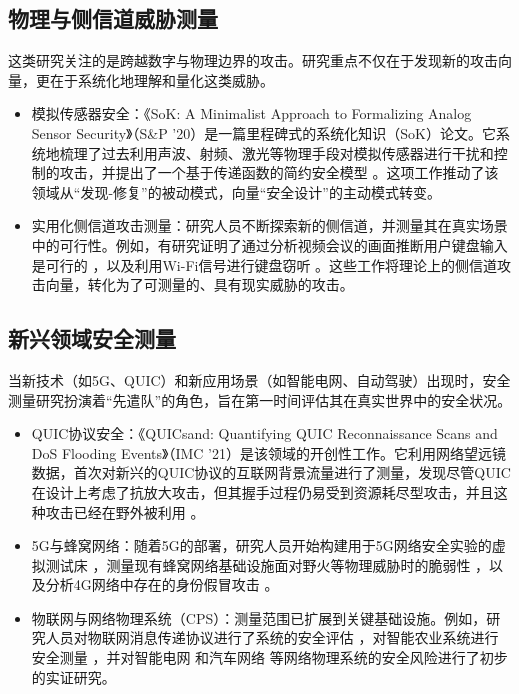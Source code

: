 \documentclass[conference]{IEEEtran}
\begin{document}
\subsection{物理与侧信道威胁测量}
这类研究关注的是跨越数字与物理边界的攻击。研究重点不仅在于发现新的攻击向量，更在于系统化地理解和量化这类威胁。
\begin{itemize}
\item 模拟传感器安全：《SoK: A Minimalist Approach to Formalizing Analog Sensor Security》（S\&P '20）是一篇里程碑式的系统化知识（SoK）论文。它系统地梳理了过去利用声波、射频、激光等物理手段对模拟传感器进行干扰和控制的攻击，并提出了一个基于传递函数的简约安全模型 。这项工作推动了该领域从“发现-修复”的被动模式，向量“安全设计”的主动模式转变。
\item 实用化侧信道攻击测量：研究人员不断探索新的侧信道，并测量其在真实场景中的可行性。例如，有研究证明了通过分析视频会议的画面推断用户键盘输入是可行的 ，以及利用Wi-Fi信号进行键盘窃听 。这些工作将理论上的侧信道攻击向量，转化为了可测量的、具有现实威胁的攻击。
\end{itemize}

\subsection{新兴领域安全测量}
当新技术（如5G、QUIC）和新应用场景（如智能电网、自动驾驶）出现时，安全测量研究扮演着“先遣队”的角色，旨在第一时间评估其在真实世界中的安全状况。
\begin{itemize}
\item QUIC协议安全：《QUICsand: Quantifying QUIC Reconnaissance Scans and DoS Flooding Events》（IMC '21）是该领域的开创性工作。它利用网络望远镜数据，首次对新兴的QUIC协议的互联网背景流量进行了测量，发现尽管QUIC在设计上考虑了抗放大攻击，但其握手过程仍易受到资源耗尽型攻击，并且这种攻击已经在野外被利用 。
\item 5G与蜂窝网络：随着5G的部署，研究人员开始构建用于5G网络安全实验的虚拟测试床 ，测量现有蜂窝网络基础设施面对野火等物理威胁时的脆弱性 ，以及分析4G网络中存在的身份假冒攻击 。
\item 物联网与网络物理系统（CPS）：测量范围已扩展到关键基础设施。例如，研究人员对物联网消息传递协议进行了系统的安全评估 ，对智能农业系统进行安全测量 ，并对智能电网  和汽车网络  等网络物理系统的安全风险进行了初步的实证研究。
\end{itemize}
\end{document}
